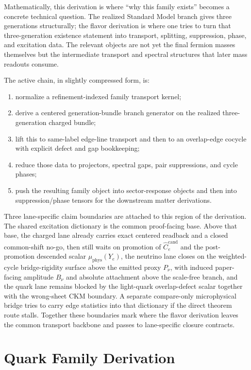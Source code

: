 \documentclass[11pt]{article}
\begin{document}
Mathematically, this derivation is where ``why this family exists'' becomes a concrete technical
question. The realized Standard Model branch gives three generations structurally; the flavor
derivation is where one tries to turn that three-generation existence statement into transport,
splitting, suppression, phase, and excitation data. The relevant objects are not yet the final
fermion masses themselves but the intermediate transport and spectral structures that later mass
readouts consume.

The active chain, in slightly compressed form, is:
\begin{enumerate}[leftmargin=2em]
\item normalize a refinement-indexed family transport kernel;
\item derive a centered generation-bundle branch generator on the realized three-generation
charged bundle;
\item lift this to same-label edge-line transport and then to an overlap-edge cocycle with
explicit defect and gap bookkeeping;
\item reduce those data to projectors, spectral gaps, pair suppressions, and cycle phases;
\item push the resulting family object into sector-response objects and then into
suppression/phase tensors for the downstream matter derivations.
\end{enumerate}

Three lane-specific claim boundaries are attached to this region of the derivation. The shared
excitation dictionary is the common proof-facing base. Above that base, the charged lane already
carries exact centered readback and a closed common-shift no-go, then still waits on promotion of
\(\widehat C_e^{\mathrm{cand}}\) and the post-promotion descended scalar
\(\mu_{\mathrm{phys}}(Y_e)\), the neutrino lane closes on the weighted-cycle
bridge-rigidity surface above the emitted proxy \(P_\nu\), with induced paper-facing amplitude \(B_\nu\) and absolute attachment above the scale-free branch, and the quark
lane remains blocked by the light-quark overlap-defect scalar together with the wrong-sheet CKM
boundary. A separate compare-only microphysical bridge tries to carry edge statistics into that
dictionary if the direct theorem route stalls. Together these boundaries mark where the flavor
derivation leaves the common transport backbone and passes to lane-specific closure contracts.

\section{Quark Family Derivation}
\end{document}
